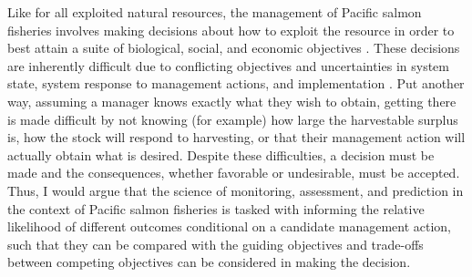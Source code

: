 \documentclass[12pt,]{book}
\theoremstyle{definition}
\theoremstyle{definition}
\theoremstyle{definition}
\theoremstyle{remark}
\begin{document}
Like for all exploited natural resources, the management of Pacific
salmon fisheries involves making decisions about how to exploit the
resource in order to best attain a suite of biological, social, and
economic objectives \citep{walters-1986}. These decisions are inherently
difficult due to conflicting objectives and uncertainties in system
state, system response to management actions, and implementation
\citep{walters-holling-1990}. Put another way, assuming a manager knows
exactly what they wish to obtain, getting there is made difficult by not
knowing (for example) how large the harvestable surplus is, how the
stock will respond to harvesting, or that their management action will
actually obtain what is desired. Despite these difficulties, a decision
must be made \citep[without decision-making there is no
management;][]{hilborn-walters-1992} and the consequences, whether
favorable or undesirable, must be accepted. Thus, I would argue that the
science of monitoring, assessment, and prediction in the context of
Pacific salmon fisheries is tasked with informing the relative
likelihood of different outcomes conditional on a candidate management
action, such that they can be compared with the guiding objectives and
trade-offs between competing objectives can be considered in making the
decision.
\end{document}
